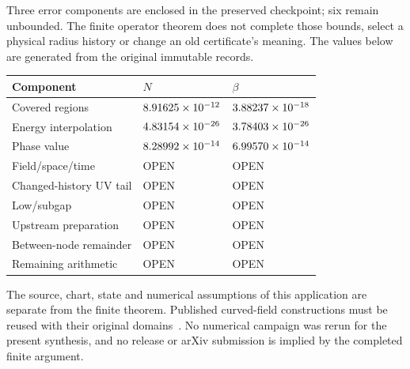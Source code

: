 \documentclass[11pt]{article}
\begin{document}
Three error components are enclosed in the preserved checkpoint; six remain
unbounded. The finite operator theorem does not complete those bounds,
select a physical radius history or change an old certificate's meaning.
The values below are generated from the original immutable records.
\begin{center}\small
\begin{tabular}{@{}lll@{}}
\toprule Component & $N$ & $\beta$\\\midrule
Covered regions & $8.91625\times10^{-12}$ & $3.88237\times10^{-18}$\\
Energy interpolation & $4.83154\times10^{-26}$ & $3.78403\times10^{-26}$\\
Phase value & $8.28992\times10^{-14}$ & $6.99570\times10^{-14}$\\
Field/space/time & OPEN & OPEN\\
Changed-history UV tail & OPEN & OPEN\\
Low/subgap & OPEN & OPEN\\
Upstream preparation & OPEN & OPEN\\
Between-node remainder & OPEN & OPEN\\
Remaining arithmetic & OPEN & OPEN\\\bottomrule
\end{tabular}
\end{center}
The source, chart, state and numerical assumptions of this application
are separate from the finite theorem. Published curved-field constructions
must be reused with their original domains~\cite{GerardHafnerWrochna2023}.
No numerical campaign was rerun for the present synthesis, and no release
or arXiv submission is implied by the completed finite argument.



\end{document}

